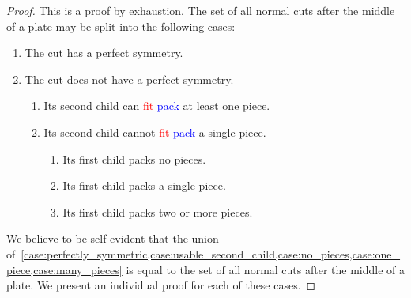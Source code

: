 \documentclass[ppgc,tese,english,formais,babel]{iiufrgs}
\newif\iffinalversion
\newcommand{\newtext}[1]{\iffinalversion%
#1%
\else%
\textcolor{blue}{#1}%
\fi%
}
\newcommand{\oldtext}[1]{\iffinalversion%
\else%
\textcolor{red}{#1}%
\fi%
}
\begin{document}
\begin{proof} This is a proof by exhaustion. The set of all normal cuts after the middle of a plate may be split into the following cases:
\begin{enumerate}
  \item The cut has a perfect symmetry. \label{case:perfectly_symmetric}
  \item The cut does not have a perfect symmetry.
  \begin{enumerate}
    \item Its second child can \oldtext{fit}\newtext{pack} at least one piece. \label{case:usable_second_child}
    \item Its second child cannot \oldtext{fit}\newtext{pack} a single piece.
    \begin{enumerate}
      \item Its first child packs no pieces. \label{case:no_pieces}
      \item Its first child packs a single piece. \label{case:one_piece} %
      \item Its first child packs two or more pieces. \label{case:many_pieces}
    \end{enumerate}
  \end{enumerate}
\end{enumerate}

We believe to be self-evident that the union of~\cref{case:perfectly_symmetric,case:usable_second_child,case:no_pieces,case:one_piece,case:many_pieces} is equal to the set of all normal cuts after the middle of a plate. We present an individual proof for each of these cases.


\end{proof}
\end{document}
